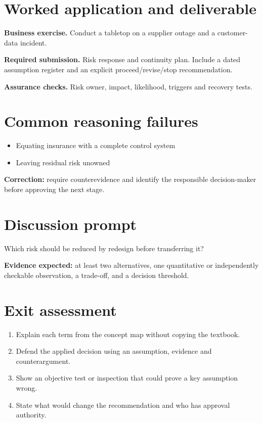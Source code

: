 \documentclass[11pt,letterpaper]{article}
\begin{document}
\section{Worked application and deliverable}
\textbf{Business exercise.} Conduct a tabletop on a supplier outage and a customer-data incident.\par\textbf{Required submission.} Risk response and continuity plan. Include a dated assumption register and an explicit proceed/revise/stop recommendation.\par\textbf{Assurance checks.} Risk owner, impact, likelihood, triggers and recovery tests.
\section{Common reasoning failures}
\begin{itemize}[leftmargin=*,itemsep=3pt]
\item Equating insurance with a complete control system
\item Leaving residual risk unowned
\end{itemize}
\noindent\textbf{Correction:} require counterevidence and identify the responsible decision-maker before approving the next stage.
\section{Discussion prompt}
Which risk should be reduced by redesign before transferring it?\par\medskip\textbf{Evidence expected:} at least two alternatives, one quantitative or independently checkable observation, a trade-off, and a decision threshold.
\section{Exit assessment}
\begin{enumerate}[leftmargin=*,itemsep=5pt]
\item Explain each term from the concept map without copying the textbook.
\item Defend the applied decision using an assumption, evidence and counterargument.
\item Show an objective test or inspection that could prove a key assumption wrong.
\item State what would change the recommendation and who has approval authority.
\end{enumerate}

\end{document}
